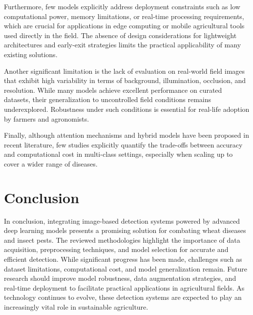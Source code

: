 Furthermore, few models explicitly address deployment constraints such as low computational power, memory limitations, or real-time processing requirements, which are crucial for applications in edge computing or mobile agricultural tools used directly in the field. The absence of design considerations for lightweight architectures and early-exit strategies limits the practical applicability of many existing solutions.

Another significant limitation is the lack of evaluation on real-world field images that exhibit high variability in terms of background, illumination, occlusion, and resolution. While many models achieve excellent performance on curated datasets, their generalization to uncontrolled field conditions remains underexplored. Robustness under such conditions is essential for real-life adoption by farmers and agronomists.

Finally, although attention mechanisms and hybrid models have been proposed in recent literature, few studies explicitly quantify the trade-offs between accuracy and computational cost in multi-class settings, especially when scaling up to cover a wider range of diseases.

\section{Conclusion}
In conclusion, integrating image-based detection systems powered by advanced deep learning models presents a promising solution for combating wheat diseases and insect pests. The reviewed methodologies highlight the importance of data acquisition, preprocessing techniques, and model selection for accurate and efficient detection. While significant progress has been made, challenges such as dataset limitations, computational cost, and model generalization remain. Future research should improve model robustness, data augmentation strategies, and real-time deployment to facilitate practical applications in agricultural fields. As technology continues to evolve, these detection systems are expected to play an increasingly vital role in sustainable agriculture.